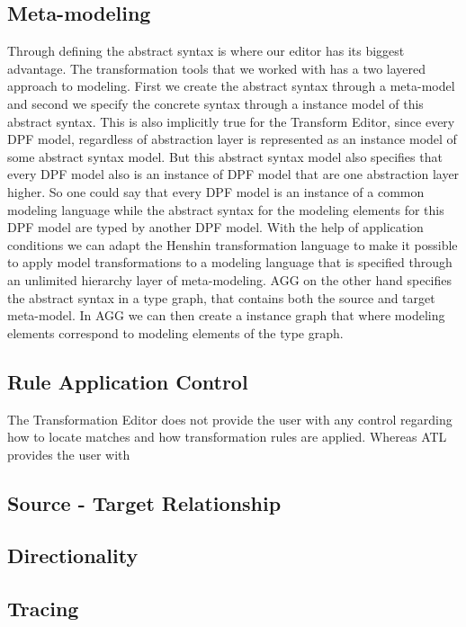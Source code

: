 \subsection{Meta-modeling}

Through defining the abstract syntax is where our editor has its biggest
advantage. The transformation tools that we worked with has a two layered
approach to modeling. First we create the abstract syntax through a meta-model
and second we specify the concrete syntax through a instance model of this
abstract syntax. This is also implicitly true for the Transform Editor, since
every DPF model, regardless of abstraction layer is represented as an instance
model of some abstract syntax model. But this abstract syntax model also
specifies that every DPF model also is an instance of DPF model that are one
abstraction layer higher. So one could say that every DPF model is an instance
of a common modeling language while the abstract syntax for the modeling
elements for this DPF model are typed by another DPF model. With the help of
application conditions we can adapt the Henshin transformation language to make
it possible to apply model transformations to a modeling language that is
specified through an unlimited hierarchy layer of meta-modeling. AGG on the
other hand specifies the abstract syntax in a type graph, that contains both the
source and target meta-model. In AGG we can then create a instance graph that
where modeling elements correspond to modeling elements of the type graph.  

\subsection{Rule Application Control}

The Transformation Editor does not provide the user with any control regarding
how to locate matches and how transformation rules are applied. Whereas ATL
provides the user with 

\subsection{Source - Target Relationship}

\subsection{Directionality}

\subsection{Tracing}


